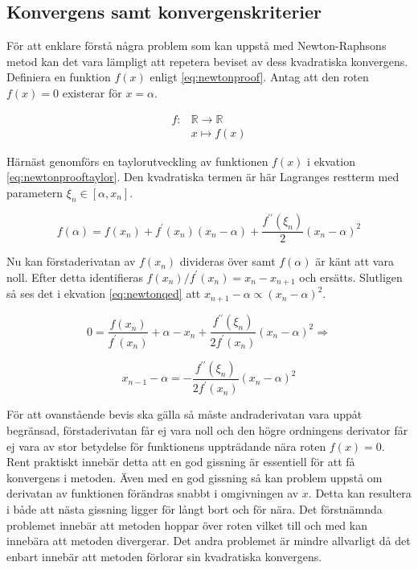 \subsection{Konvergens samt konvergenskriterier}

För att enklare förstå några problem som kan uppstå med Newton-Raphsons metod kan det vara lämpligt
att repetera beviset av dess kvadratiska konvergens. Definiera en funktion $f(x)$ enligt \eqref{eq:newtonproof}.
Antag att den roten $f(x) = 0$ existerar för $x = \alpha$.

\begin{align}
f: & \mathbb{R} \to \mathbb{R} \nonumber \\
   & x \mapsto f(x) \label{eq:newtonproof}
\end{align}

\noindent
Härnäst genomförs en taylorutveckling av funktionen $f(x)$ i ekvation \eqref{eq:newtonprooftaylor}.
Den kvadratiska termen är här Lagranges restterm med parametern $\xi_n \in [\alpha, x_n]$.

\begin{equation}
\label{eq:newtonprooftaylor}
f(\alpha) = f(x_n) + f^\prime(x_n)(x_n-\alpha) + \frac{f^{\prime\prime}(\xi_n)}{2}(x_n-\alpha)^2
\end{equation}

\noindent
Nu kan förstaderivatan av $f(x_n)$ divideras över samt $f(\alpha)$ är känt att vara noll.
Efter detta identifieras $f(x_n)/f^\prime(x_n) = x_n-x_{n+1}$ och ersätts. Slutligen så ses
det i ekvation \eqref{eq:newtonqed} att $x_{n+1}-\alpha \propto (x_{n}-\alpha)^2$.

\begin{equation}
0 = \frac{f(x_n)}{f^\prime(x_n)} + \alpha - x_n + \frac{f^{\prime\prime}(\xi_n)}{2f^\prime(x_n)}(x_n-\alpha)^2
\Rightarrow
\end{equation}

\begin{equation}
\label{eq:newtonqed}
x_{n-1} - \alpha = - \frac{f^{\prime\prime}(\xi_n)}{2f^\prime(x_n)}(x_n-\alpha)^2 
\end{equation}

\noindent
För att ovanstående bevis ska gälla så måste andraderivatan vara uppåt begränsad, förstaderivatan får ej
vara noll och den högre ordningens derivator får ej vara av stor betydelse för funktionens uppträdande
nära roten $f(x) = 0$. Rent praktiskt innebär detta att en god gissning är essentiell för att få
konvergens i metoden. Även med en god gissning så kan problem uppstå om derivatan av funktionen
förändras snabbt i omgivningen av $x$. Detta kan resultera i både att nästa gissning ligger för långt
bort och för nära. Det förstnämnda problemet innebär att metoden hoppar över roten vilket till och med
kan innebära att metoden divergerar. Det andra problemet är mindre allvarligt då det enbart innebär 
att metoden förlorar sin kvadratiska konvergens.

